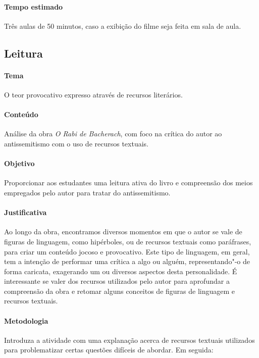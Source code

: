 \documentclass[12pt]{extarticle}
\begin{document}
\paragraph{Tempo estimado} Três aulas de 50 minutos, caso a 
exibição do filme seja feita em sala de aula.


\subsection{Leitura}

\paragraph{Tema} O teor provocativo expresso através de recursos literários.

\paragraph{Conteúdo} Análise da obra \emph{O Rabi de Bacherach}, 
com foco na crítica do autor ao antissemitismo com o uso de recursos textuais.

\paragraph{Objetivo} Proporcionar aos estudantes uma leitura ativa do livro
e compreensão dos meios empregados pelo autor para tratar do antissemitismo.

\paragraph{Justificativa} Ao longo da obra, encontramos diversos momentos em que o
autor se vale de figuras de linguagem, como hipérboles, ou de recursos
textuais como paráfrases, para criar um conteúdo jocoso e provocativo.
Este tipo de linguagem, em geral, tem a intenção de performar uma
crítica a algo ou alguém, representando"-o de forma caricata, exagerando
um ou diversos aspectos desta personalidade. É interessante se valer dos recursos
utilizados pelo autor para aprofundar a compreensão da obra e retomar alguns conceitos de figuras de linguagem e recursos textuais.

\paragraph{Metodologia}

Introduza a atividade com uma explanação acerca de recursos textuais 
utilizados para problematizar certas questões difíceis de abordar. 
Em seguida: 
\end{document}
